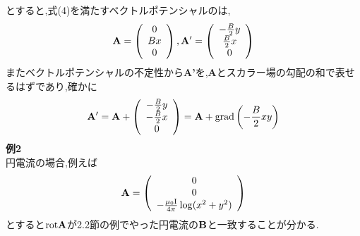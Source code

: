 \documentclass[../main]{subfiles}
\begin{document}
とすると,式(4)を満たすベクトルポテンシャルのは,
\begin{eqnarray*}
{\bf A}=\left(
\begin{array}{c}
0 \\
Bx \\
0
\end{array}
\right),
{\bf A'}=\left(
\begin{array}{c}
- \frac{B}{2}y \\
\frac{B}{2}x \\
0
\end{array}
\right)
\end{eqnarray*}
またベクトルポテンシャルの不定性から{\bf A'}を,{\bf A}とスカラー場の勾配の和で表せるはずであり,確かに \\
\begin{eqnarray*}
{\bf A'} = {\bf A} +\left(
\begin{array}{c}
- \frac{B}{2}y \\
-\frac{B}{2}x \\
0
\end{array}
\right)
={\bf A}+ {\rm grad}\left(-\frac{B}{2}xy\right)
\end{eqnarray*}
{\bf 例2} \\
円電流の場合,例えば
\begin{eqnarray*}
{\bf A} = \left(
\begin{array}{c}
0 \\
0 \\
-\frac{\mu_0 {\rm I}}{4 \pi} \log(x^2+y^2)
\end{array}
\right)
\end{eqnarray*}
とすると${\rm rot}{\bf A}$が2.2節の例でやった円電流の${\bf B}$と一致することが分かる.
\end{document}
